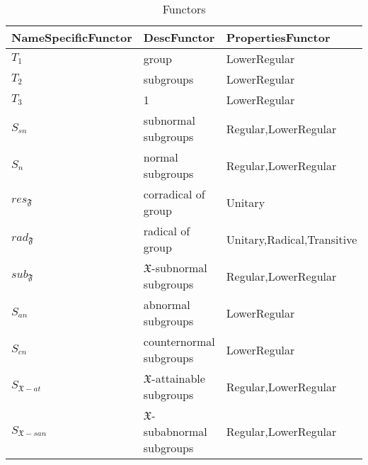 \documentclass[a4paper,14pt]{extarticle}
\begin{document}
\begin{table}[]
	\centering
	\caption{Functors}
	\label{my-label}
	\begin{tabular}{|l|l|l|} \hline
		NameSpecificFunctor    & DescFunctor                          & PropertiesFunctor          \\ \hline
		$T_1$                  & group                                & LowerRegular               \\ \hline
		$T_2$                  & subgroups                            & LowerRegular               \\ \hline
		$T_3$                  & 1                                    & LowerRegular               \\ \hline
		$S_{sn}$               & subnormal subgroups                  & Regular,LowerRegular       \\ \hline
		$S_n$                  & normal subgroups                     & Regular,LowerRegular       \\ \hline
		$res_{\mathfrak{F}}$   & corradical of group                  & Unitary                    \\ \hline
		$rad_{\mathfrak{F}}$   & radical of group                     & Unitary,Radical,Transitive \\ \hline
		$sub_\mathfrak{F}$     & $\mathfrak{X}$-subnormal subgroups   & Regular,LowerRegular       \\ \hline
		$S_{an}$               & abnormal subgroups                   & LowerRegular               \\ \hline
		$S_{cn}$               & counternormal subgroups              & LowerRegular               \\ \hline
		$S_{\mathfrak{X}-at}$  & $\mathfrak{X}$-attainable subgroups  & Regular,LowerRegular       \\ \hline
		$S_{\mathfrak{X}-san}$ & $\mathfrak{X}$-subabnormal subgroups & Regular,LowerRegular \\ \hline     
	\end{tabular}
\end{table}
\end{document}
